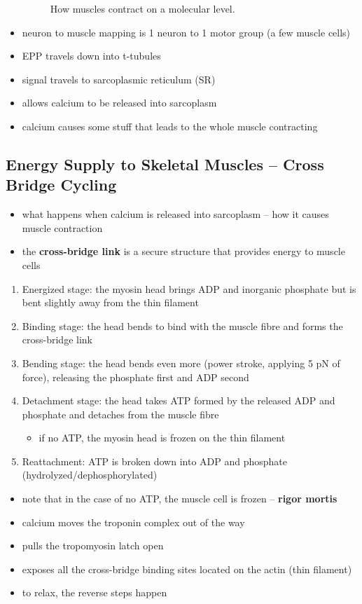 \documentclass[10pt]{article}
\begin{document}
\begin{itemize}
\begin{figure}[H]
            \caption{How muscles contract on a molecular level.}
            \label{fig:molecularMuscleContraction}
        \end{figure}
    \item neuron to muscle mapping is 1 neuron to 1 motor group (a few muscle cells)
    \item EPP travels down into t-tubules
    \item signal travels to sarcoplasmic reticulum (SR)
    \item allows calcium to be released into sarcoplasm
    \item calcium causes some stuff that leads to the whole muscle contracting
\end{itemize}

\subsection{Energy Supply to Skeletal Muscles -- Cross Bridge Cycling}
\begin{itemize}
    \item what happens when calcium is released into sarcoplasm -- how it causes muscle contraction
    \item the \textbf{cross-bridge link} is a secure structure that provides energy to muscle cells
\end{itemize}
\begin{enumerate}
    \item Energized stage: the myosin head brings ADP and inorganic phosphate but is bent slightly away from the thin filament
    \item Binding stage: the head bends to bind with the muscle fibre and forms the cross-bridge link
    \item Bending stage: the head bends even more (power stroke, applying 5 pN of force), releasing the phosphate first and ADP second
    \item Detachment stage: the head takes ATP formed by the released ADP and phosphate and detaches from the muscle fibre
        \begin{itemize}
            \item if no ATP, the myosin head is frozen on the thin filament
        \end{itemize}
    \item Reattachment: ATP is broken down into ADP and phosphate (hydrolyzed/dephosphorylated)
\end{enumerate}
\begin{itemize}
    \item note that in the case of no ATP, the muscle cell is frozen -- \textbf{rigor mortis} 
    \item calcium moves the troponin complex out of the way
    \item pulls the tropomyosin latch open
    \item exposes all the cross-bridge binding sites located on the actin (thin filament)
    \item to relax, the reverse steps happen
\end{itemize}
\end{document}
